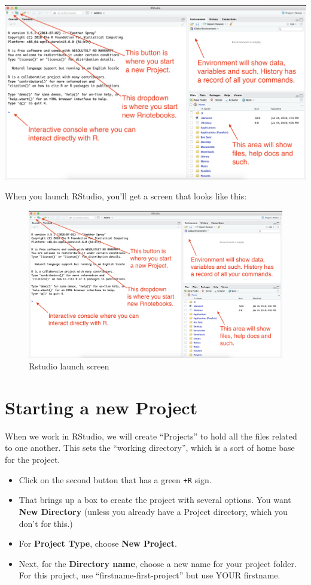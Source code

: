 \documentclass[]{book}
\providecommand{\tightlist}{%
  \setlength{\itemsep}{0pt}\setlength{\parskip}{0pt}}
\begin{document}
\includegraphics[width=0.5\linewidth]{images/02-rstudio-start}

When you launch RStudio, you'll get a screen that looks like this:

\begin{figure}
\centering
\includegraphics[width=6.25000in]{images/02-rstudio-start.png}
\caption{Rstudio launch screen}
\end{figure}

\section{Starting a new Project}\label{starting-a-new-project}

When we work in RStudio, we will create ``Projects'' to hold all the
files related to one another. This sets the ``working directory'', which
is a sort of home base for the project.

\begin{itemize}
\tightlist
\item
  Click on the second button that has a green \texttt{+R} sign.
\item
  That brings up a box to create the project with several options. You
  want \textbf{New Directory} (unless you already have a Project
  directory, which you don't for this.)
\item
  For \textbf{Project Type}, choose \textbf{New Project}.
\item
  Next, for the \textbf{Directory name}, choose a new name for your
  project folder. For this project, use ``firstname-first-project'' but
  use YOUR firstname.
\end{itemize}
\end{document}

